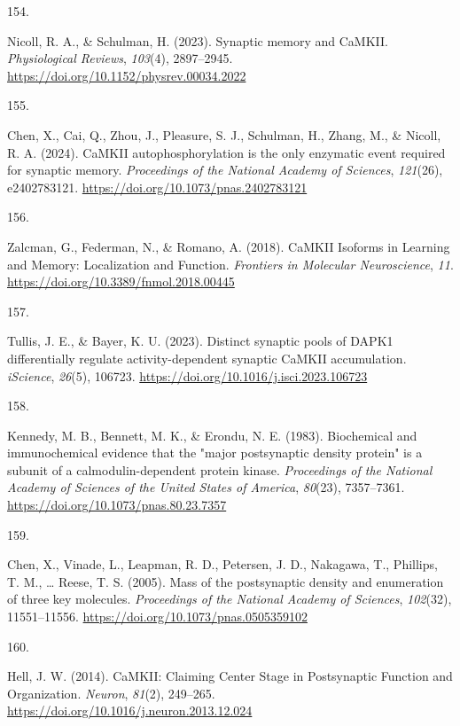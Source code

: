 \documentclass[
  11pt,
  letterpaper,
]{scrreprt}
\newlength{\cslhangindent}
\newlength{\csllabelwidth}
\newenvironment{CSLReferences}[2] %
 {\begin{list}{}{%
  \setlength{\itemindent}{0pt}
  \setlength{\leftmargin}{0pt}
  \setlength{\parsep}{0pt}
  \ifodd #1
   \setlength{\leftmargin}{\cslhangindent}
   \setlength{\itemindent}{-1\cslhangindent}
  \fi
  \setlength{\itemsep}{#2\baselineskip}}}
 {\end{list}}
\newcommand{\CSLLeftMargin}[1]{\parbox[t]{\csllabelwidth}{\strut#1\strut}}
\newcommand{\CSLRightInline}[1]{\parbox[t]{\linewidth - \csllabelwidth}{\strut#1\strut}}
\begin{document}
\begin{CSLReferences}{0}{0}
\CSLLeftMargin{154. }%
\CSLRightInline{Nicoll, R. A., \& Schulman, H. (2023). Synaptic memory
and {CaMKII}. \emph{Physiological Reviews}, \emph{103}(4), 2897--2945.
\url{https://doi.org/10.1152/physrev.00034.2022}}

\CSLLeftMargin{155. }%
\CSLRightInline{Chen, X., Cai, Q., Zhou, J., Pleasure, S. J., Schulman,
H., Zhang, M., \& Nicoll, R. A. (2024). {CaMKII} autophosphorylation is
the only enzymatic event required for synaptic memory. \emph{Proceedings
of the National Academy of Sciences}, \emph{121}(26), e2402783121.
\url{https://doi.org/10.1073/pnas.2402783121}}

\CSLLeftMargin{156. }%
\CSLRightInline{Zalcman, G., Federman, N., \& Romano, A. (2018). {CaMKII
Isoforms} in {Learning} and {Memory}: {Localization} and {Function}.
\emph{Frontiers in Molecular Neuroscience}, \emph{11}.
\url{https://doi.org/10.3389/fnmol.2018.00445}}

\CSLLeftMargin{157. }%
\CSLRightInline{Tullis, J. E., \& Bayer, K. U. (2023). Distinct synaptic
pools of {DAPK1} differentially regulate activity-dependent synaptic
{CaMKII} accumulation. \emph{iScience}, \emph{26}(5), 106723.
\url{https://doi.org/10.1016/j.isci.2023.106723}}

\CSLLeftMargin{158. }%
\CSLRightInline{Kennedy, M. B., Bennett, M. K., \& Erondu, N. E. (1983).
Biochemical and immunochemical evidence that the "major postsynaptic
density protein" is a subunit of a calmodulin-dependent protein kinase.
\emph{Proceedings of the National Academy of Sciences of the United
States of America}, \emph{80}(23), 7357--7361.
\url{https://doi.org/10.1073/pnas.80.23.7357}}

\CSLLeftMargin{159. }%
\CSLRightInline{Chen, X., Vinade, L., Leapman, R. D., Petersen, J. D.,
Nakagawa, T., Phillips, T. M., \ldots{} Reese, T. S. (2005). Mass of the
postsynaptic density and enumeration of three key molecules.
\emph{Proceedings of the National Academy of Sciences}, \emph{102}(32),
11551--11556. \url{https://doi.org/10.1073/pnas.0505359102}}

\CSLLeftMargin{160. }%
\CSLRightInline{Hell, J. W. (2014). {CaMKII}: {Claiming Center Stage} in
{Postsynaptic Function} and {Organization}. \emph{Neuron}, \emph{81}(2),
249--265. \url{https://doi.org/10.1016/j.neuron.2013.12.024}}


\end{CSLReferences}
\end{document}
